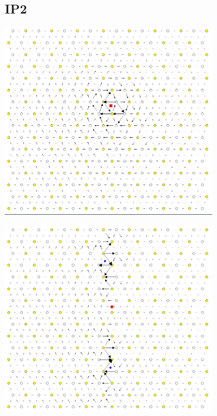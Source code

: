 \documentclass[11pt]{article}
\begin{document}
\subsection{IP2}
\label{sec:orgd02264e}
\begin{center}
\includegraphics[width=0.7\textwidth]{Images/final_model_IP2_partial_dd_initial..png}
\end{center}
\begin{center}
\includegraphics[width=0.7\textwidth]{Images/final_model_IP2_partial_dd_final.png}
\end{center}
\end{document}
